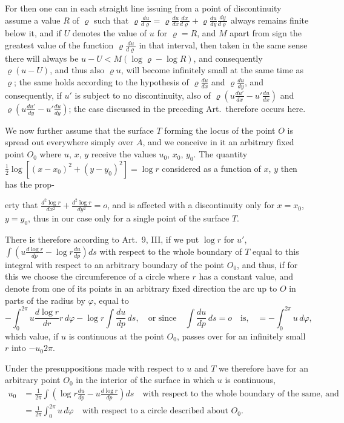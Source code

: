 \documentclass{article}
\begin{document}
For then one can in each straight line issuing from a point of discontinuity assume a value $R$ of $\varrho$ such that $\varrho\frac{du}{d\varrho} = \varrho\frac{du}{dx}\frac{dx}{d\varrho} + \varrho\frac{du}{dy}\frac{dy}{d\varrho}$ always remains finite below it, and if $U$ denotes the value of $u$ for $\varrho = R$, and $M$ apart from sign the greatest value of the function $\varrho\frac{du}{d\varrho}$ in that interval, then taken in the same sense there will always be $u - U < M(\log\varrho - \log R)$, and consequently $\varrho(u - U)$, and thus also $\varrho u$, will become infinitely small at the same time as $\varrho$; the same holds according to the hypothesis of $\varrho\frac{du}{dx}$ and $\varrho\frac{du}{dy}$, and consequently, if $u'$ is subject to no discontinuity, also of $\varrho\left(u\frac{du'}{dx} - u'\frac{du}{dx}\right)$ and $\varrho\left(u\frac{du'}{dy} - u'\frac{du}{dy}\right)$; the case discussed in the preceding Art.\ therefore occurs here.

We now further assume that the surface $T$ forming the locus of the point $O$ is spread out everywhere simply over $A$, and we conceive in it an arbitrary fixed point $O_0$ where $u$, $x$, $y$ receive the values $u_0$, $x_0$, $y_0$. The quantity $\frac{1}{2}\log[(x - x_0)^2 + (y - y_0)^2] = \log r$ considered as a function of $x$, $y$ then has the prop-

erty that $\frac{d^2\log r}{dx^2} + \frac{d^2\log r}{dy^2} = o$, and is affected with a discontinuity only for $x = x_0$, $y = y_0$, thus in our case only for a single point of the surface $T$.

There is therefore according to Art.~9, III, if we put $\log r$ for $u'$, $\displaystyle\int \left(u\frac{d\log r}{dp} - \log r\frac{du}{dp}\right) ds$ with respect to the whole boundary of $T$ equal to this integral with respect to an arbitrary boundary of the point $O_0$, and thus, if for this we choose the circumference of a circle where $r$ has a constant value, and denote from one of its points in an arbitrary fixed direction the arc up to $O$ in parts of the radius by $\varphi$, equal to
\[
-\int_0^{2\pi} u\frac{d\log r}{dr} r\,d\varphi - \log r\int \frac{du}{dp}\,ds, \quad \text{or since} \quad \int \frac{du}{dp}\,ds = o \quad \text{is,} \quad = -\int_0^{2\pi} u\,d\varphi,
\]
which value, if $u$ is continuous at the point $O_0$, passes over for an infinitely small $r$ into $-u_0 2\pi$.

Under the presuppositions made with respect to $u$ and $T$ we therefore have for an arbitrary point $O_0$ in the interior of the surface in which $u$ is continuous,
\[
\begin{aligned}
u_0 &= \frac{1}{2\pi}\int \left(\log r\frac{du}{dp} - u\frac{d\log r}{dp}\right) ds \quad \text{with respect to the whole boundary of the same, and} \\
&= \frac{1}{2\pi}\int_0^{2\pi} u\,d\varphi \quad \text{with respect to a circle described about } O_0 \text{.}
\end{aligned}
\]
\end{document}
